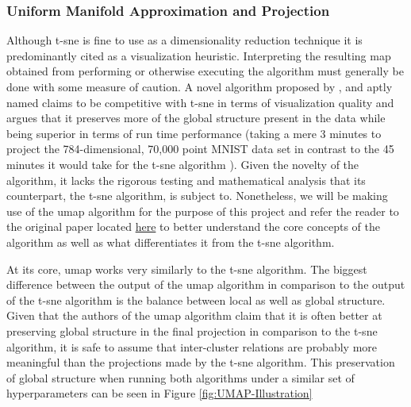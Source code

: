 \subsubsection{Uniform Manifold Approximation and Projection}
\label{subsec:Background-Information:Dimension-Reduction:t-Distributed-Stochastic-Neighbor-Embedding:Uniform-Manifold-Approximation-and-Projection}
Although \gls{t-sne} is fine to use as a dimensionality reduction technique it is predominantly cited as a visualization heuristic. Interpreting the resulting map obtained from performing or otherwise executing the algorithm must generally be done with some measure of caution. A novel algorithm proposed by \citet{UMAP}, and aptly named  claims to be competitive with \gls{t-sne} in terms of visualization quality and argues that it preserves more of the global structure present in the data while being superior in terms of run time  performance (\eg taking a mere 3 minutes to project the 784-dimensional, 70,000 point MNIST data set in contrast to the 45 minutes it would take for the \gls{t-sne} algorithm \cite{UMAP2}). Given the novelty of the algorithm, it lacks the rigorous testing and mathematical analysis that its counterpart, the \gls{t-sne} algorithm, is subject to. Nonetheless, we will be making use of the \gls{umap} algorithm for the purpose of this project and refer the reader to the original paper located \href{https://arxiv.org/abs/1802.03426}{here} \cite{UMAP} to better understand the core concepts of the algorithm as well as what differentiates it from the \gls{t-sne} algorithm.

\noindent \newline At its core, \gls{umap} works very similarly to the \gls{t-sne} algorithm. The biggest difference between the output of the \gls{umap} algorithm in comparison to the output of the \gls{t-sne} algorithm is the balance between local as well as global structure. Given that the authors of the \gls{umap} algorithm claim that it is often better at preserving global structure in the final projection in comparison to the \gls{t-sne} algorithm, it is safe to assume that inter-cluster relations are probably more meaningful than the projections made by the \gls{t-sne} algorithm. This preservation of global structure when running both algorithms under a similar set of hyperparameters can be seen in Figure \ref{fig:UMAP-Illustration}

